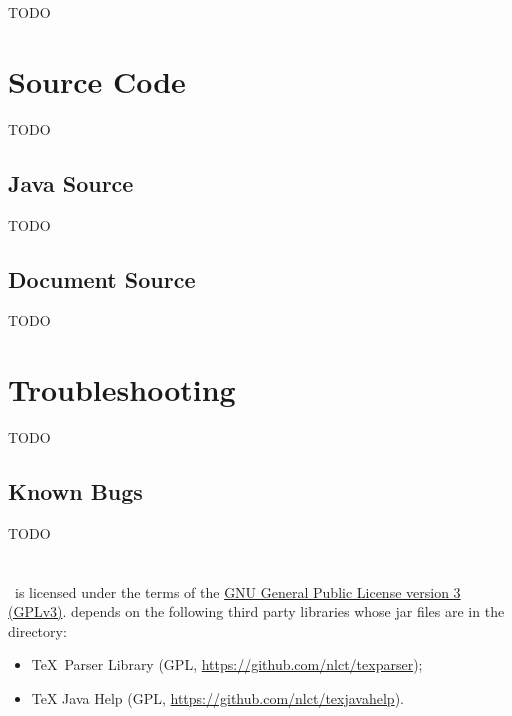 TODO


\chapter{Source Code}\label{sec:sourcecode}

TODO


\section{Java Source}\label{sec:javasource}

TODO


\section{Document Source}\label{sec:docsource}

TODO


\chapter{Troubleshooting}\label{sec:troubleshooting}

TODO


\section{Known Bugs}\label{sec:knownbugs}

TODO

\chapter{}
\label{sec:licence}

%
\appname\ is licensed under the terms of the 
\href{https://www.gnu.org/licenses/gpl-3.0.html}{GNU General
Public License version 3 (GPLv3)}.
 depends on the following third party libraries whose jar files are
in the  directory:
\begin{itemize}
   \item \TeX\ Parser Library 
   (GPL, \url{https://github.com/nlct/texparser});
   \item TeX Java Help 
   (GPL, \url{https://github.com/nlct/texjavahelp}).
\end{itemize}



\printmain
\printindex 

 

